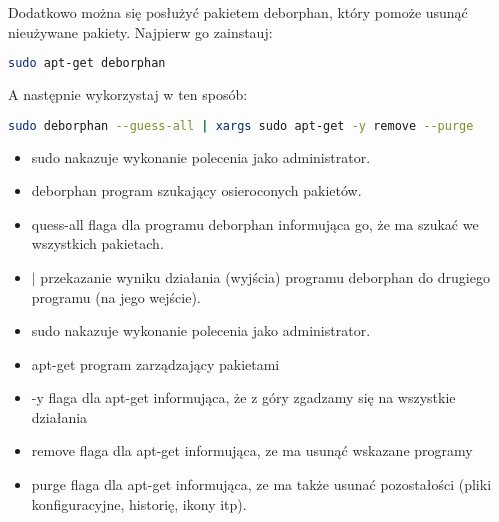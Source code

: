 Dodatkowo można się posłużyć pakietem \textcolor{ubuntu_orange}{deborphan}, który pomoże usunąć nieużywane pakiety. Najpierw go zainstauj:
\begin{lstlisting}[language=bash]
sudo apt-get deborphan
\end{lstlisting}
A następnie wykorzystaj w ten sposób:
\begin{lstlisting}[language=bash]
sudo deborphan --guess-all | xargs sudo apt-get -y remove --purge
\end{lstlisting}
\begin{itemize}
\item \textcolor{ubuntu_orange}{sudo} nakazuje wykonanie polecenia jako administrator.
\item \textcolor{ubuntu_orange}{deborphan} program szukający osieroconych pakietów.
\item \textcolor{ubuntu_orange}{\-\-quess-all} flaga dla programu deborphan informująca go, że ma szukać we wszystkich pakietach.
\item \textcolor{ubuntu_orange}{$\vert$} przekazanie wyniku działania (wyjścia) programu deborphan do drugiego programu (na jego wejście).
\item \textcolor{ubuntu_orange}{sudo} nakazuje wykonanie polecenia jako administrator.
\item \textcolor{ubuntu_orange}{apt-get} program zarządzający pakietami
\item \textcolor{ubuntu_orange}{-y} flaga dla apt-get informująca, że z góry zgadzamy się na wszystkie działania
\item \textcolor{ubuntu_orange}{remove} flaga dla apt-get informująca, ze ma usunąć wskazane programy
\item \textcolor{ubuntu_orange}{\-\-purge} flaga dla apt-get informująca, ze ma także usunać pozostałości (pliki konfiguracyjne, historię, ikony itp).
\end{itemize}